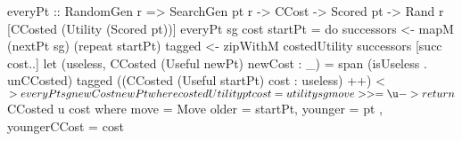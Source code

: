 everyPt :: RandomGen r
        => SearchGen pt r -> CCost -> Scored pt
        -> Rand r [CCosted (Utility (Scored pt))]
everyPt sg cost startPt = do
  successors <- mapM (nextPt sg) (repeat startPt)
  tagged <- zipWithM costedUtility successors [succ cost..]
  let (useless, CCosted (Useful newPt) newCost : _) =
                      span (isUseless . unCCosted) tagged
  ((CCosted (Useful startPt) cost : useless) ++) <$>
                                  everyPt sg newCost newPt
 where costedUtility pt cost =
         utility sg move >>= \u -> return $ CCosted u cost
        where move = Move { older = startPt, younger = pt
                          , youngerCCost = cost }
